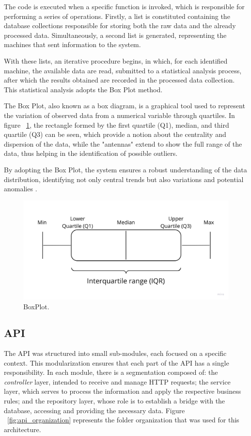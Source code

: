 The code is executed when a specific function is invoked, which is responsible for performing a series of operations. Firstly, a list is constituted containing the database collections responsible for storing both the raw data and the already processed data. Simultaneously, a second list is generated, representing the machines that sent information to the system.

With these lists, an iterative procedure begins, in which, for each identified machine, the available data are read, submitted to a statistical analysis process, after which the results obtained are recorded in the processed data collection. This statistical analysis adopts the Box Plot method.

The Box Plot, also known as a box diagram, is a graphical tool used to represent the variation of observed data from a numerical variable through quartiles. In figure ~\ref{fig:boxplot}, the rectangle formed by the first quartile (Q1), median, and third quartile (Q3) can be seen, which provide a notion about the centrality and dispersion of the data, while the "antennas" extend to show the full range of the data, thus helping in the identification of possible outliers.

By adopting the Box Plot, the system ensures a robust understanding of the data distribution, identifying not only central trends but also variations and potential anomalies \cite{marmolejo2010shifting}.

\begin{figure}[htbp]
	\centering
	\includegraphics[width=\textwidth]{images/boxplot.jpg}
	\caption{BoxPlot.}
	\label{fig:boxplot}
\end{figure}


\subsection{API}\label{subsec:apiArchitecture}
The \gls{API} was structured into small sub-modules, each focused on a specific context. This modularization ensures that each part of the \gls{API} has a single responsibility. In each module, there is a segmentation composed of: the \textit{controller} layer, intended to receive and manage \gls{HTTP} requests; the service layer, which serves to process the information and apply the respective business rules; and the repository layer, whose role is to establish a bridge with the database, accessing and providing the necessary data. Figure ~\ref{fig:api_organization} represents the folder organization that was used for this architecture.

